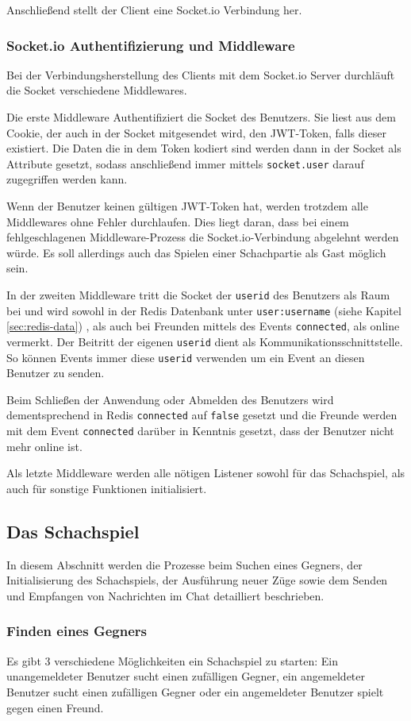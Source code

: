 Anschließend stellt der Client eine Socket.io Verbindung her.

\subsubsection{Socket.io Authentifizierung und Middleware}
\label{sec:socketauth}
Bei der Verbindungsherstellung des Clients mit dem Socket.io Server durchläuft die Socket verschiedene Middlewares.

Die erste Middleware Authentifiziert die Socket des Benutzers. Sie liest aus dem Cookie, der auch in der Socket mitgesendet wird, den JWT-Token, falls dieser existiert. Die Daten die in dem Token kodiert sind werden dann in der Socket als Attribute gesetzt, sodass anschließend immer mittels \verb|socket.user| darauf zugegriffen werden kann.

Wenn der Benutzer keinen gültigen JWT-Token hat, werden trotzdem alle Middlewares ohne Fehler durchlaufen. Dies liegt daran, dass bei einem fehlgeschlagenen Middleware-Prozess die Socket.io-Verbindung abgelehnt werden würde. Es soll allerdings auch das Spielen einer Schachpartie als Gast möglich sein.

In der zweiten Middleware tritt die Socket der \verb|userid| des Benutzers als Raum bei und wird sowohl in der Redis Datenbank unter \verb|user:username| (siehe Kapitel \ref{sec:redis-data}) , als auch bei Freunden mittels des Events \verb|connected|, als online vermerkt.
Der Beitritt der eigenen \verb|userid| dient als Kommunikationsschnittstelle. So können Events immer diese \verb|userid| verwenden um ein Event an diesen Benutzer zu senden.

Beim Schließen der Anwendung oder Abmelden des Benutzers wird dementsprechend in Redis \verb|connected| auf \verb|false| gesetzt und die Freunde werden mit dem Event \verb|connected| darüber in Kenntnis gesetzt, dass der Benutzer nicht mehr online ist.

Als letzte Middleware werden alle nötigen Listener sowohl für das Schachspiel, als auch für sonstige Funktionen initialisiert.
\subsection{Das Schachspiel}
\label{sec:Schach-Backend}
In diesem Abschnitt werden die Prozesse beim Suchen eines Gegners, der Initialisierung des Schachspiels, der Ausführung neuer Züge sowie dem Senden und Empfangen von Nachrichten im Chat detailliert beschrieben.
\subsubsection{Finden eines Gegners}
\label{sec:find_game}
Es gibt 3 verschiedene Möglichkeiten ein Schachspiel zu starten: Ein unangemeldeter Benutzer sucht einen zufälligen Gegner, ein angemeldeter Benutzer sucht einen zufälligen Gegner oder ein angemeldeter Benutzer spielt gegen einen Freund.

